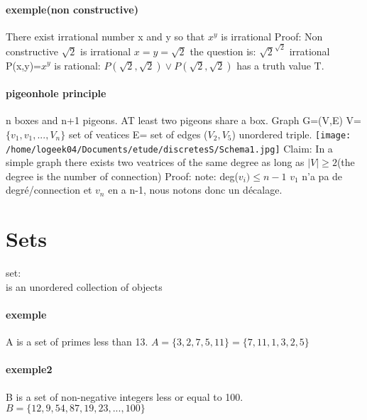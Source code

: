 \documentclass[a4paper,10pt]{article}
\begin{document}
\paragraph{exemple(non constructive)}
There exist irrational number x and y so that $x^y$ is irrational
\newline
Proof: Non constructive
\newline
$\sqrt{2}$ is irrational
\newline
$x=y=\sqrt{2}$
\newline
the question is: $\sqrt{2}^{\sqrt{2}}$ irrational
\newline
P(x,y)=$x^y$ is rational: $P(\sqrt{2},\sqrt{2})\vee P(\sqrt{2},\sqrt{2})$ has a truth value T.
\paragraph{pigeonhole principle}
n boxes and n+1 pigeons. AT least two pigeons share a box.
\newline
Graph G=(V,E)
\newline
V=$\{v_1,v_1,...,V_n\}$ set of veatices
\newline
E= set of edges ($V_2,V_5$) unordered triple.
\texttt{[image: /home/logeek04/Documents/etude/discretesS/Schema1.jpg]}
\newline
Claim: In a simple graph there exists two veatrices of the same degree as long as $|V|\geq 2$(the degree is the number of connection)
\newline
Proof:
\newline
note: deg($v_i)\leq n-1$
\newline
$v_1$ n'a pa de degré/connection et $v_n$ en a n-1, nous notons donc un décalage.

\section{Sets}
\begin{description}
 \item set:\\{is an unordered collection of objects}
\end{description}
\paragraph{exemple}
A is a set of primes less than 13.
\newline
$A=\{3,2,7,5,11\}=\{7,11,1,3,2,5\}$
\paragraph{exemple2}
B is a set of non-negative integers less or equal to 100.
\newline
$B=\{12,9,54,87,19,23,...,100\}$
\end{document}
